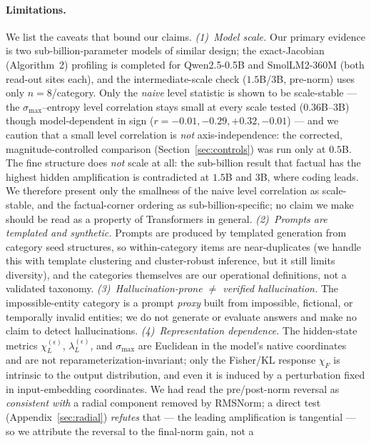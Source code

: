 \documentclass{article}
\begin{document}
\paragraph{Limitations.}
We list the caveats that bound our claims. \emph{(1)~Model scale.} Our primary evidence is two
sub-billion-parameter models of similar design; the exact-Jacobian (Algorithm~2) profiling is
completed for Qwen2.5-0.5B and SmolLM2-360M (both read-out sites each), and the
intermediate-scale check ($1.5$B/$3$B, pre-norm) uses only $n=8$/category. Only the \emph{naive} level
statistic is shown to be scale-stable --- the $\sigma_{\max}$--entropy level correlation stays small at
every scale tested ($0.36$B--$3$B) though model-dependent in sign
($r=-0.01,-0.29,+0.32,-0.01$) --- and we caution that a small level correlation is \emph{not}
axis-independence: the corrected, magnitude-controlled comparison (Section~\ref{sec:controls}) was run
only at $0.5$B. The fine structure does \emph{not} scale at all: the sub-billion result that factual
has the highest hidden amplification is contradicted at $1.5$B and $3$B, where coding leads. We
therefore present only the smallness of the naive level correlation as scale-stable, and the
factual-corner ordering as sub-billion-specific; no claim we make should be read as a property of
Transformers in general.
\emph{(2)~Prompts are templated and synthetic.} Prompts are produced by templated generation from
category seed structures, so within-category items are near-duplicates (we handle this with
template clustering and cluster-robust inference, but it still limits diversity), and the categories
themselves are our operational definitions, not a validated taxonomy. \emph{(3)~Hallucination-prone
$\ne$ verified hallucination.} The impossible-entity category is a prompt \emph{proxy} built from
impossible, fictional, or temporally invalid entities; we do not generate or evaluate answers and
make no claim to detect hallucinations. \emph{(4)~Representation dependence.} The hidden-state
metrics $\chi_L^{(\epsilon)}$, $\lambda_L^{(\epsilon)}$, and $\sigma_{\max}$ are Euclidean in the
model's native coordinates and are not reparameterization-invariant; only the Fisher/KL response
$\chi_F$ is intrinsic to the output distribution, and even it is induced by a perturbation fixed in
input-embedding coordinates. We had read the pre/post-norm reversal as \emph{consistent with} a radial
component removed by RMSNorm; a direct test (Appendix~\ref{sec:radial}) \emph{refutes} that --- the
leading amplification is tangential --- so we attribute the reversal to the final-norm gain, not a
\end{document}
